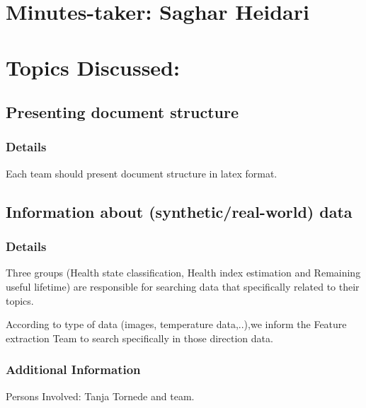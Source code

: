 \documentclass[11pt]{meetingmins} %
\begin{document}
\maketitle

\section{Minutes-taker: Saghar Heidari}

\section{Topics Discussed:}

\subsection{Presenting document structure}
    \subsubsection{Details}
        \begin{hiddensubitems}
            \item
              Each team should present document structure in latex format.  
        \end{hiddensubitems}
        
\subsection{Information about (synthetic/real-world) data }
    \subsubsection{Details}
        \begin{hiddensubitems}
            \item
               Three groups (Health state classification, Health index estimation and Remaining useful lifetime) are responsible for searching data that specifically related to their topics.
            \item
               According to type of data (images, temperature data,..),we inform the Feature extraction Team to search specifically in those direction data.
        \end{hiddensubitems}
    \subsubsection{Additional Information}
        \begin{hiddensubitems}
            \item
                Persons Involved: Tanja Tornede and team.
        \end{hiddensubitems}   
\end{document}
